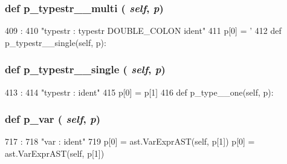 \begin{DoxyVerb}
{\subsubsection[{p\_\-typestr\_\-\_\-multi}]{\setlength{\rightskip}{0pt plus 5cm}def p\_\-typestr\_\-\_\-multi ( {\em self}, \/   {\em p})}}
\label{classslicc_1_1parser_1_1SLICC_a3bcdc6f6c174bab04271d90873cf8eaa}



\begin{DoxyCode}
409                                  :
410         "typestr : typestr DOUBLE_COLON ident"
411         p[0] = '%
412 
    def p_typestr__single(self, p):
\end{DoxyCode}
\hypertarget{classslicc_1_1parser_1_1SLICC_ac16b68e08eec93c439a56e9ba502a8ae}{
\subsubsection[{p\_\-typestr\_\-\_\-single}]{\setlength{\rightskip}{0pt plus 5cm}def p\_\-typestr\_\-\_\-single ( {\em self}, \/   {\em p})}}
\label{classslicc_1_1parser_1_1SLICC_ac16b68e08eec93c439a56e9ba502a8ae}



\begin{DoxyCode}
413                                   :
414         "typestr : ident"
415         p[0] = p[1]
416 
    def p_type__one(self, p):
\end{DoxyCode}
\hypertarget{classslicc_1_1parser_1_1SLICC_af78da2861487d68d5e3d8709c1f10fda}{
\subsubsection[{p\_\-var}]{\setlength{\rightskip}{0pt plus 5cm}def p\_\-var ( {\em self}, \/   {\em p})}}
\label{classslicc_1_1parser_1_1SLICC_af78da2861487d68d5e3d8709c1f10fda}



\begin{DoxyCode}
717                       :
718         "var : ident"
719         p[0] = ast.VarExprAST(self, p[1])
        p[0] = ast.VarExprAST(self, p[1])
\end{DoxyCode}
\hypertarget{classslicc_1_1parser_1_1SLICC_a731b8aa21a36b5326ec2ebe9c8dba349}{
}
\end{DoxyVerb}
